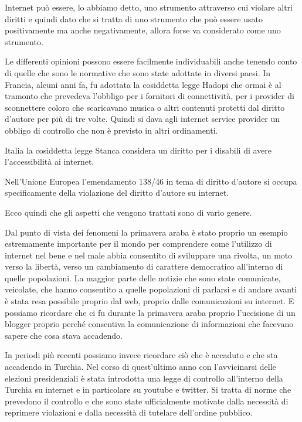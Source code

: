 Internet può essere, lo abbiamo detto, uno strumento attraverso cui violare altri diritti e quindi dato che si tratta di uno strumento che può essere usato positivamente ma anche negativamente, allora forse va considerato come uno strumento.

Le differenti opinioni possono essere facilmente individuabili anche tenendo conto di quelle che sono le normative che sono state adottate in diversi paesi. In Francia, alcuni anni fa, fu adottata la cosiddetta legge Hadopi che ormai è al tramonto che prevedeva l'obbligo per i fornitori di connettività, per i provider di sconnettere coloro che scaricavano musica o altri contenuti protetti dal diritto d'autore per più di tre volte. Quindi si dava agli internet service provider un obbligo di controllo che non è previsto in altri ordinamenti. 

Italia la cosiddetta legge Stanca considera un diritto per i disabili di avere l'accessibilità ai internet.

Nell'Unione Europea l'emendamento 138/46 in tema di diritto d'autore si occupa specificamente della violazione del diritto d'autore su internet.

Ecco quindi che gli aspetti che vengono trattati sono di vario genere.\par
Dal punto di vista dei fenomeni la primavera araba è stato proprio un esempio estremamente importante per il mondo per comprendere come l'utilizzo di internet nel bene e nel male abbia consentito di sviluppare una rivolta, un moto verso la libertà, verso un cambiamento di carattere democratico all'interno di quelle popolazioni. La maggior parte delle notizie che sono state comunicate, veicolate, che hanno consentito a quelle popolazioni di parlarsi e di andare avanti è stata resa possibile proprio dal web, proprio dalle comunicazioni su internet. E possiamo ricordare che ci fu durante la primavera araba proprio l'uccisione di un blogger proprio perché consentiva la comunicazione di informazioni che facevano sapere che cosa stava accadendo.

In periodi più recenti possiamo invece ricordare ciò che è accaduto e che sta accadendo in Turchia. Nel corso di quest'ultimo anno con l'avvicinarsi delle elezioni presidenziali è stata introdotta una legge di controllo all'interno della Turchia su internet e in particolare su youtube e twitter. Si tratta di norme che prevedono il controllo e che sono state ufficialmente motivate dalla necessità di reprimere violazioni e dalla necessità di tutelare dell'ordine pubblico.

